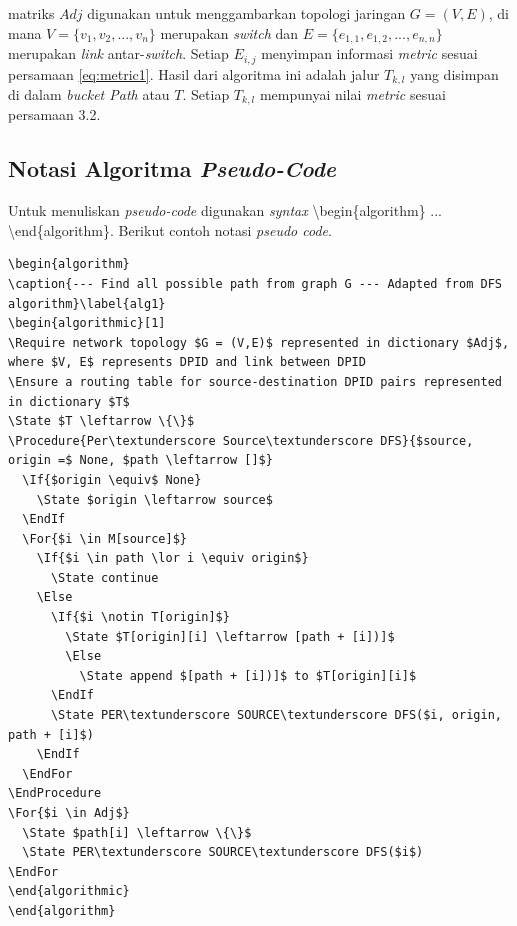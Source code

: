 \begin{itemize}
\begin{lstlisting}[language=tex]
\end{lstlisting}
matriks $Adj$ digunakan untuk menggambarkan topologi jaringan  $G = (V,E)$, di mana $V = \{v_{1}, v_{2}, ..., v_{n}\}$ merupakan \textit{switch} dan $E = \{e_{1,1}, e_{1,2}, ..., e_{n,n}\}$ merupakan \textit{link} antar-\textit{switch}. Setiap $E_{i,j}$ menyimpan informasi \textit{metric} sesuai persamaan \ref{eq:metric1}. Hasil dari algoritma ini adalah jalur $T_{k,l}$ yang disimpan di dalam \textit{bucket Path} atau $T$. Setiap $T_{k,l}$ mempunyai nilai \textit{metric} sesuai persamaan 3.2.
\end{itemize} 

\subsection{Notasi Algoritma \textit{Pseudo-Code}}
Untuk menuliskan \textit{pseudo-code} digunakan \textit{syntax} \textbackslash begin\{algorithm\} ... \textbackslash end\{algorithm\}. Berikut contoh notasi \textit{pseudo code}.
\begin{lstlisting}
\begin{algorithm}
\caption{--- Find all possible path from graph G --- Adapted from DFS algorithm}\label{alg1}
\begin{algorithmic}[1]
\Require network topology $G = (V,E)$ represented in dictionary $Adj$, where $V, E$ represents DPID and link between DPID
\Ensure a routing table for source-destination DPID pairs represented in dictionary $T$
\State $T \leftarrow \{\}$
\Procedure{Per\textunderscore Source\textunderscore DFS}{$source, origin =$ None, $path \leftarrow []$}
  \If{$origin \equiv$ None}
    \State $origin \leftarrow source$
  \EndIf
  \For{$i \in M[source]$}
    \If{$i \in path \lor i \equiv origin$}
      \State continue
    \Else
      \If{$i \notin T[origin]$}
        \State $T[origin][i] \leftarrow [path + [i])]$
        \Else
          \State append $[path + [i])]$ to $T[origin][i]$
      \EndIf
      \State PER\textunderscore SOURCE\textunderscore DFS($i, origin, path + [i]$)
    \EndIf
  \EndFor
\EndProcedure
\For{$i \in Adj$}
  \State $path[i] \leftarrow \{\}$
  \State PER\textunderscore SOURCE\textunderscore DFS($i$)
\EndFor
\end{algorithmic}
\end{algorithm}
\end{lstlisting}

